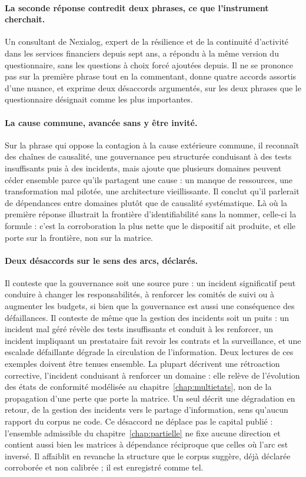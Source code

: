 \paragraph{La seconde réponse contredit deux phrases, ce que l'instrument cherchait.}
Un consultant de Nexialog, expert de la résilience et de la continuité d'activité dans les
services financiers depuis sept ans, a répondu à la même version du questionnaire, sans les
questions à choix forcé ajoutées depuis. Il ne se prononce pas sur la première phrase tout en la
commentant, donne quatre accords assortis d'une nuance, et exprime deux désaccords argumentés,
sur les deux phrases que le questionnaire désignait comme les plus importantes.

\paragraph{La cause commune, avancée sans y être invité.} Sur la phrase qui oppose la contagion à
la cause extérieure commune, il reconnaît des chaînes de causalité, une gouvernance peu
structurée conduisant à des tests insuffisants puis à des incidents, mais ajoute que plusieurs
domaines peuvent céder ensemble parce qu'ils partagent une cause : un manque de ressources, une
transformation mal pilotée, une architecture vieillissante. Il conclut qu'il parlerait de
dépendances entre domaines plutôt que de causalité systématique. Là où la première réponse
illustrait la frontière d'identifiabilité sans la nommer, celle-ci la formule : c'est la
corroboration la plus nette que le dispositif ait produite, et elle porte sur la frontière, non
sur la matrice.

\paragraph{Deux désaccords sur le sens des arcs, déclarés.} Il conteste que la gouvernance soit une
source pure : un incident significatif peut conduire à changer les responsabilités, à renforcer
les comités de suivi ou à augmenter les budgets, si bien que la gouvernance est aussi une
conséquence des défaillances. Il conteste de même que la gestion des incidents soit un puits : un
incident mal géré révèle des tests insuffisants et conduit à les renforcer, un incident impliquant
un prestataire fait revoir les contrats et la surveillance, et une escalade défaillante dégrade la
circulation de l'information. Deux lectures de ces exemples doivent être tenues ensemble. La
plupart décrivent une rétroaction corrective, l'incident conduisant à renforcer un domaine :
elle relève de l'évolution des états de conformité modélisée au chapitre~\ref{chap:multietats},
non de la propagation d'une perte que porte la matrice. Un seul décrit une dégradation en retour,
de la gestion des incidents vers le partage d'information, sens qu'aucun rapport du corpus ne
code. Ce désaccord ne déplace pas le capital publié : l'ensemble admissible du
chapitre~\ref{chap:partielle} ne fixe aucune direction et contient aussi bien les matrices à
dépendance réciproque que celles où l'arc est inversé. Il affaiblit en revanche la structure que
le corpus suggère, déjà déclarée corroborée et non calibrée ; il est enregistré comme tel.

